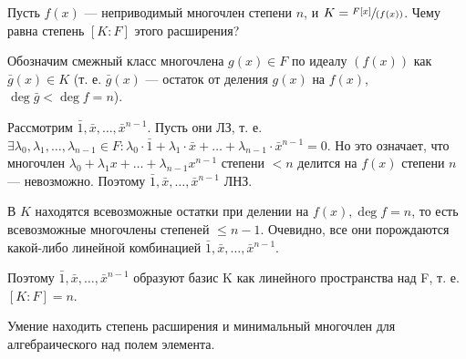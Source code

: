\begin{problem}
Пусть $f(x)$ --- неприводимый многочлен степени $n$, и $K = \sfrac{F[x]}{(f(x))}$. Чему равна степень $[K : F]$ этого расширения?
\end{problem}

\begin{solution}
Обозначим смежный класс многочлена \(g(x) \in F\) по идеалу $(f(x))$ как \(\bar{g}(x) \in K\) (т. е. $\bar{g}(x)$ --- остаток от деления $g(x)$ на $f(x)$, $\deg \bar{g} < \deg f = n$). 

Рассмотрим \(\bar{1}, \bar{x}, \dots, \bar{x}^{n-1}\). Пусть они ЛЗ, т. е. \(\exists \lambda_0, \lambda_1, \dots, \lambda_{n-1} \in F: \lambda_0\cdot\bar{1}+\lambda_1\cdot\bar{x}+\dots+\lambda_{n-1}\cdot\bar{x}^{n-1} = 0\). Но это означает, что многочлен $\lambda_0+\lambda_1x+\dots+\lambda_{n-1}x^{n-1}$ степени $<n$ делится на $f(x)$ степени $n$ --- невозможно. 
Поэтому \(\bar{1}, \bar{x}, \dots, \bar{x}^{n-1}\) ЛНЗ.

В $K$ находятся всевозможные остатки при делении на $f(x), \deg f = n$, то есть всевозможные многочлены степеней $\le n-1$. Очевидно, все они порождаются какой-либо линейной комбинацией \(\bar{1}, \bar{x}, \dots, \bar{x}^{n-1}\).

Поэтому \(\bar{1}, \bar{x}, \dots, \bar{x}^{n-1}\) образуют базис K как линейного пространства над F, т. е. \([K:F] = n\).
\end{solution}

\begin{problem}[34 (7.9,7.10)] Умение находить степень расширения и минимальный многочлен для алгебраического над полем элемента.
\end{problem}

